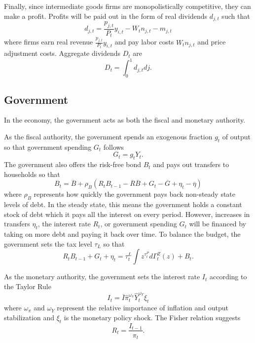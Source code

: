 Finally, since intermediate goods firms are monopolistically competitive, they can make a profit. Profits will be paid out in the form of real dividends $d_{j, t}$ such that
\begin{equation*}
    d_{j, t} = \frac{p_{j, t}}{P_t} y_{i, t} - W_t n_{j, t} - m_{j, t}
\end{equation*}
where firms earn real revenue $\frac{p_{j, t}}{P_t} y_{i, t}$ and pay labor costs $W_t n_{j, t}$ and price adjustment costs. Aggregate dividends $D_t$ are
\begin{equation*}
    D_t = \int_0^1 d_{j, t} dj.
\end{equation*}


\subsection{Government}

In the economy, the government acts as both the fiscal and monetary authority.

As the fiscal authority, the government spends an exogenous fraction $g_t$ of output so that government spending $G_t$ follows
\begin{equation*}
    G_t = g_t Y_t.
\end{equation*}
The government also offers the risk-free bond $B_t$ and pays out transfers to households so that
\begin{equation*}
    B_t = \overline{B} + \rho_B \left(R_t B_{t-1} - \overline{R} \overline{B} + G_t - \overline{G} + \eta_t - \overline{\eta}\right)
\end{equation*}
where $\rho_B$ represents how quickly the government pays back non-steady state levels of debt. In the steady state, this means the government holds a constant stock of debt which it pays all the interest on every period. However, increases in transfers $\eta_t$, the interest rate $R_t$, or government spending $G_t$ will be financed by taking on more debt and paying it back over time. To balance the budget, the government sets the tax level $\tau_L$ so that
\begin{equation*}
    R_t B_{t - 1} + G_t + \eta_t = \tau_t^L \int z^{\tau_t^P} d \Gamma_t^Z (z) + B_t.
\end{equation*}

As the monetary authority, the government sets the interest rate $I_t$ according to the Taylor Rule
\begin{equation*}
    I_t = \overline{I} \hat{\pi}_t^{\omega_\pi} \hat{Y}_t^{\omega_Y} \xi_t
\end{equation*}
where $\omega_\pi$ and $\omega_Y$ represent the relative importance of inflation and output stabilization and $\xi_t$ is the monetary policy shock. The Fisher relation suggests
\begin{equation*}
    R_t = \frac{I_{t - 1}}{\pi_t}.
\end{equation*}


